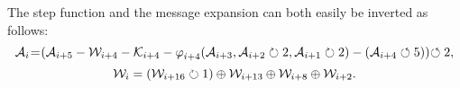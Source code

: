 \noindent
The step function and the message expansion can both easily be inverted as follows:
\begin{equation}
\label{eq:rec_step_inv}
\mathcal{A}_{i}\hspace{-0.7mm}=\hspace{-0.8mm}(\mathcal{A}_{i+5} - \mathcal{W}_{i+4} - \mathcal{K}_{i+4} - \operatorname{\varphi}_{i+4}(\mathcal{A}_{i+3},\mathcal{A}_{i+2}\circlearrowright 2,\mathcal{A}_{i+1}\circlearrowright 2) -
(\mathcal{A}_{i+4} \circlearrowleft 5))\hspace{-0.8mm}\circlearrowleft 2,
\end{equation}
\begin{equation}
\label{eq:exp_mess_inv}
\mathcal{W}_{i} = (\mathcal{W}_{i+16} \circlearrowright 1) \oplus \mathcal{W}_{i+13} \oplus \mathcal{W}_{i+8} \oplus \mathcal{W}_{i+2}.
\end{equation}
